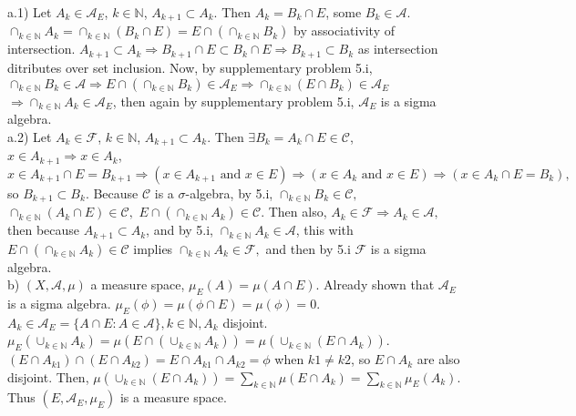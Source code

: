 \documentclass[12pt]{article}
\begin{document}
\begin{flushleft}
a.1) Let $A_k \in \mathcal{A}_E$, $k \in \mathbb{N}$, $A_{k+1} \subset A_{k} $. Then $A_k = B_k \cap E$, some $B_k \in \mathcal{A}.$ $ \cap_{k \in \mathbb{N} } A_k = \cap_{k \in \mathbb{N} } (B_k \cap E) = E \cap( \cap_{k \in \mathbb{N} } B_k)$ by associativity of intersection. $A_{k+1} \subset A_{k} \Rightarrow B_{k+1}\cap E \subset B_{k}\cap E \Rightarrow B_{k+1}  \subset B_{k} $ as intersection ditributes over set inclusion. Now, by supplementary problem 5.i, $\cap_{k \in \mathbb{N} } B_k \in \mathcal{A} \Rightarrow E \cap (\cap_{k \in \mathbb{N} } B_k ) \in \mathcal{A}_E \Rightarrow \cap_{k \in \mathbb{N} } ( E \cap B_k ) \in \mathcal{A}_E$ $ \Rightarrow \cap_{k \in \mathbb{N} } A_k \in \mathcal{A}_E$, then again by supplementary problem 5.i, $\mathcal{A}_E$ is a sigma algebra.\\
a.2) Let $A_k \in \mathcal{F}$, $k \in \mathbb{N}$, $A_{k+1} \subset A_{k} $. Then $ \exists B_k = A_k \cap E \in \mathcal{C}$, $x \in A_{k+1} \Rightarrow x \in A_k$, 
$x \in A_{k+1} \cap E = B_{k+1} \Rightarrow ( x \in A_{k+1} \textrm{ and } x \in E ) \Rightarrow ( x \in A_{k} \textrm{ and } x \in E )  \Rightarrow ( x \in A_{k}\cap E = B_{k} ),$  so $B_{k+1} \subset B_{k}.$ Because $\mathcal{C}$ is a $\sigma$-algebra, by 5.i, $\cap_{k \in \mathbb{N}} B_k \in \mathcal{C},$ $\cap_{k \in \mathbb{N}} (A_k \cap E ) \in \mathcal{C},$ $ E \cap (\cap_{k \in \mathbb{N}} A_k)  \in \mathcal{C}.$ Then also, $A_k \in \mathcal{F} \Rightarrow A_k \in \mathcal{A},$ then because $A_{k+1} \subset A_{k}$, and by 5.i, $\cap_{k \in \mathbb{N}} A_k \in \mathcal{A}$, this with $ E \cap (\cap_{k \in \mathbb{N}} A_k)  \in \mathcal{C}$ implies $\cap_{k \in \mathbb{N}} A_k \in \mathcal{F},$ and then by 5.i $\mathcal{F}$ is a sigma algebra.\\
b) $(X,\mathcal{A},\mu)$ a measure space, $\mu_E(A) = \mu(A \cap E)$. Already shown that $\mathcal{A}_E$ is a sigma algebra. $\mu_E (\phi) = \mu(\phi \cap E) = \mu(\phi) = 0$. $A_k \in \mathcal{A}_E = \{ A \cap E: A \in \mathcal{A} \} , k\in \mathbb{N},  A_k$ disjoint. $\mu_E( \cup_{k \in \mathbb{N}} A_k )  = \mu( E \cap (\cup_{k \in \mathbb{N}} A_k )) = \mu( \cup_{k \in \mathbb{N}}(E \cap A_k))$. $(E \cap A_{k1}) \cap (E \cap A_{k2}) = E \cap A_{k1} \cap A_{k2} = \phi$ when $k1 \not = k2$, so $E \cap A_k$ are also disjoint. Then, $\mu( \cup_{k \in \mathbb{N}}(E \cap A_k)) = \sum_{k \in \mathbb{N}} \mu(E \cap A_k) = \sum_{k \in \mathbb{N}} \mu_E(A_k)$. Thus $(E,\mathcal{A}_E,\mu_E)$ is a measure space.
\end{flushleft}
\end{document}
